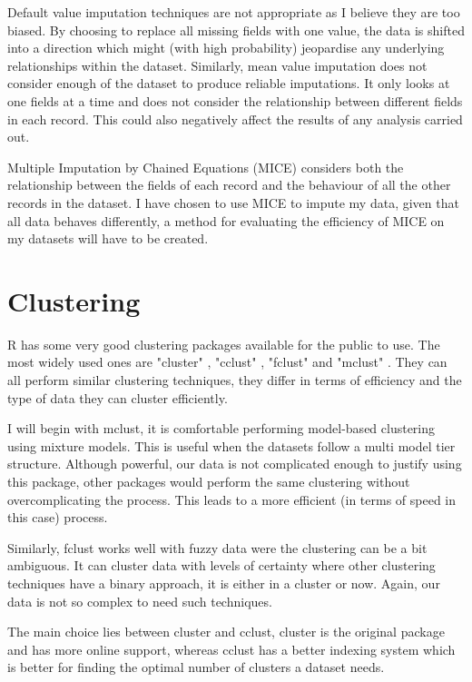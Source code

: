 \documentclass[bsc]{abdnthesis}
\begin{document}
Default value imputation techniques are not appropriate as I believe they are too biased. By choosing to replace all missing fields with one value, the data is shifted into a direction which might (with high probability) jeopardise any underlying relationships within the dataset. Similarly, mean value imputation does not consider enough of the dataset to produce reliable imputations. It only looks at one fields at a time and does not consider the relationship between different fields in each record. This could also negatively affect the results of any analysis carried out. 

Multiple Imputation by Chained Equations (MICE) \cite{imp-mice} considers both the relationship between the fields of each record and the behaviour of all the other records in the dataset. I have chosen to use MICE to impute my data, given that all data behaves differently, a method for evaluating the efficiency of MICE on my datasets will have to be created. 
\section{Clustering} %
\label{sec:clustering}
R has some very good clustering packages available for the public to use. The most widely used ones are "cluster" \cite{clust-cluster}, "cclust" \cite{ clust-cclust}, "fclust" \cite{ clust-fclust} and "mclust" \cite{ clust-mclust}. They can all perform similar clustering techniques, they differ in terms of efficiency and the type of data they can cluster efficiently. 

I will begin with mclust, it is comfortable performing model-based clustering using mixture models. This is useful when the datasets follow a multi model tier structure. Although powerful, our data is not complicated enough to justify using this package, other packages would perform the same clustering without overcomplicating the process. This leads to a more efficient (in terms of speed in this case) process. 

Similarly, fclust works well with fuzzy data were the clustering can be a bit ambiguous. It can cluster data with levels of certainty where other clustering techniques have a binary approach, it is either in a cluster or now. Again, our data is not so complex to need such techniques. 

The main choice lies between cluster and cclust, cluster is the original package and has more online support, whereas cclust has a better indexing system which is better for finding the optimal number of clusters a dataset needs. 
\end{document}
